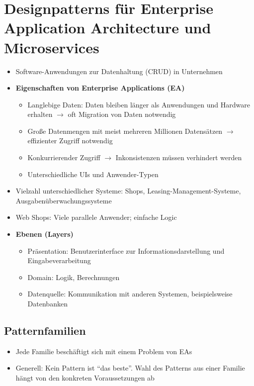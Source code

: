 \section{Designpatterns für Enterprise Application Architecture und Microservices}
\begin{itemize}
	\item Software-Anwendungen zur Datenhaltung (CRUD) in Unternehmen
	\item \textbf{Eigenschaften von Enterprise Applications (EA)}
	\begin{itemize}
		\item Langlebige Daten: Daten bleiben länger als Anwendungen und Hardware erhalten \(\rightarrow\) oft Migration von Daten notwendig
		\item Große Datenmengen mit meist mehreren Millionen Datensätzen \(\rightarrow\) effizienter Zugriff notwendig
		\item Konkurrierender Zugriff \(\rightarrow\) Inkonsistenzen müssen verhindert werden
		\item Unterschiedliche UIs und Anwender-Typen
	\end{itemize}
	\item Vielzahl unterschiedlicher Systeme: Shops, Leasing-Management-Systeme, Ausgabenüberwachungssysteme
	\item Web Shops: Viele parallele Anwender; einfache Logic
	\item \textbf{Ebenen (Layers)}
	\begin{itemize}
		\item Präsentation: Benutzerinterface zur Informationsdarstellung und Eingabeverarbeitung
		\item Domain: Logik, Berechnungen
		\item Datenquelle: Kommunikation mit anderen Systemen, beispielsweise Datenbanken
	\end{itemize}
\end{itemize}


\subsection{Patternfamilien}
\begin{itemize}
	\item Jede Familie beschäftigt sich mit einem Problem von EAs
	\item Generell: Kein Pattern ist "`das beste"'. Wahl des Patterns aus einer Familie hängt von den konkreten Voraussetzungen ab
\end{itemize}

